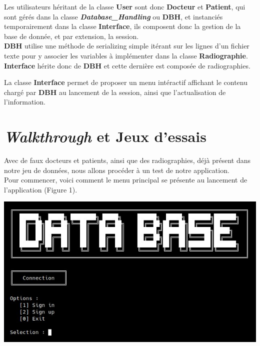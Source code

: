 \documentclass[12pt,a4paper]{article}
\newenvironment{Figure}
{\par\medskip\noindent\minipage{\linewidth}}
{\endminipage\par\medskip}
\begin{document}
\begin{multicols}{2}
		Les utilisateurs héritant de la classe \textbf{User} sont donc \textbf{Docteur} et \textbf{Patient}, qui sont gérés dans la classe \textbf{\textit{Database\_Handling}} ou \textbf{DBH}, et instanciés temporairement dans la classe \textbf{Interface}, ils composent donc la gestion de la base de donnée, et par extension, la session. \\
				
		\textbf{DBH} utilise une méthode de serializing simple itérant sur les lignes d'un fichier texte pour y associer les variables à implémenter dans la classe \textbf{Radiographie}. \textbf{Interface} hérite donc de \textbf{DBH} et cette dernière est composée de radiographies.
				
		La classe \textbf{Interface} permet de proposer un menu intéractif affichant le contenu chargé par \textbf{DBH} au lancement de la session, ainsi que l'actualisation de l'information.
				
		\section{\textit{Walkthrough} et Jeux d'essais}
				
		Avec de faux docteurs et patients, ainsi que des radiographies, déjà présent dans notre jeu de données, nous allons procéder à un test de notre application. \\
				
		Pour commencer, voici comment le menu principal se présente au lancement de l'application (Figure 1). \\
		\begin{Figure}
			\centering
			\includegraphics[width=\linewidth]{images/walkthrough/entree.jpg}
			\label{fig:menu_principal}
		\end{Figure}
				

\end{multicols}
\end{document}
